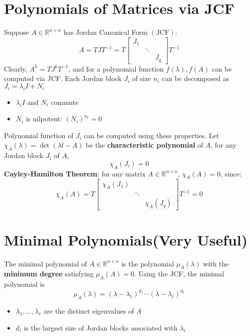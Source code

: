 \documentclass[10pt,a4paper,oneside]{article}
\begin{document}
\section{Polynomials of Matrices via JCF}
Suppose $A \in \mathbb{R}^{n\times n}$ has Jordan Canonical Form $(\mathrm{JCF})$:
\[
A=T J T^{-1}=T\left[\begin{array}{lll}{J_{1}} & {} \\ {} & {\ddots} & {} \\ {} & {} & {J_{q}}\end{array}\right] T^{-1}
\]
Clearly, $A^k = T J^k T^{-1}$, and for a polynomial function $f(\lambda), f(A)$ can be computed via JCF. Each Jordan block $J_{i}$ of size $n_{i}$ can be decomposed as $J_{i}=\lambda_{i} I+N_{i}$
\begin{itemize}
\item $\lambda_{i} I$ and $N_{i}$ commute
\item $N_{i}$ is nilpotent: $\left(N_{i}\right)^{n_{i}}=0$
\end{itemize}
Polynomial function of $J_{i}$ can be computed using these properties.
Let $\chi_{A}(\lambda)=\operatorname{det}(\lambda l-A)$ be the \textbf{characteristic polynomial} of $A$, for any Jordan block $J_{i}$ of $A$,
\[
\chi_{A}\left(J_{i}\right)=0
\]
\textbf{Cayley-Hamilton Theorem}: for any matrix $A\in \mathbb{R}^{n\times n}$, $\chi_{A}(A)=0$, since:
\[
\chi_{A}(A)=T\left[\begin{array}{ccc}{\chi_{A}\left(J_{1}\right)} & {} & {} \\ {} & {\ddots} & {} \\ {} & {} & {\chi_{A}\left(J_{q}\right)}\end{array}\right] T^{-1}=0
\]
\section{Minimal Polynomials(Very Useful)}
The minimal polynomial of $A \in \mathbb{R}^{n \times n}$ is the polynomial $\mu_{A}(\lambda)$ with the \textbf{minimum degree} satisfying $\mu_{A}(A)=0$. Using the JCF, the minimal polynomial is
\[
\mu_{A}(\lambda)=\left(\lambda-\lambda_{1}\right)^{d_{1}} \cdots\left(\lambda-\lambda_{\ell}\right)^{d_{\ell}}
\]
\begin{itemize}
\item $\lambda_{1}, \ldots, \lambda_{\ell}$ are the distinct eigenvalues of $A$
\item $d_{i}$ is the largest size of Jordan blocks associated with $\lambda_{i}$
\end{itemize}
\end{document}
